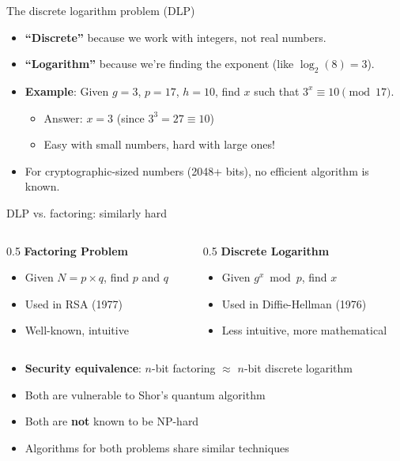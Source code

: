 \ifdefined\PRESENTATION\else\PassOptionsToClass{handout}{beamer}\fi\documentclass[aspectratio=169, lualatex]{beamer}
\begin{document}
\begin{frame}{The discrete logarithm problem (DLP)}
	\begin{itemize}[<+->]
		\item \textbf{``Discrete''} because we work with integers, not real numbers.
		\item \textbf{``Logarithm''} because we're finding the exponent (like $\log_2(8) = 3$).
		\item \textbf{Example}: Given $g = 3$, $p = 17$, $h = 10$, find $x$ such that $3^x \equiv 10 \pmod{17}$.
		      \begin{itemize}
			      \item Answer: $x = 3$ (since $3^3 = 27 \equiv 10$)
			      \item Easy with small numbers, hard with large ones!
		      \end{itemize}
		\item For cryptographic-sized numbers (2048+ bits), no efficient algorithm is known.
	\end{itemize}
\end{frame}

\begin{frame}{DLP vs. factoring: similarly hard}
	\begin{columns}[c]
		\begin{column}{0.5\textwidth}
			\textbf{Factoring Problem}
			\begin{itemize}[<+->]
				\item Given $N = p \times q$, find $p$ and $q$
				\item Used in RSA (1977)
				\item Well-known, intuitive
			\end{itemize}
		\end{column}
		\begin{column}{0.5\textwidth}
			\textbf{Discrete Logarithm}
			\begin{itemize}[<+->]
				\item Given $g^x \bmod p$, find $x$
				\item Used in Diffie-Hellman (1976)
				\item Less intuitive, more mathematical
			\end{itemize}
		\end{column}
	\end{columns}
	\vspace{1cm}
	\begin{itemize}[<+->]
		\item \textbf{Security equivalence}: $n$-bit factoring $\approx$ $n$-bit discrete logarithm
		\item Both are vulnerable to Shor's quantum algorithm
		\item Both are \textbf{not} known to be NP-hard
		\item Algorithms for both problems share similar techniques
	\end{itemize}
\end{frame}
\end{document}
